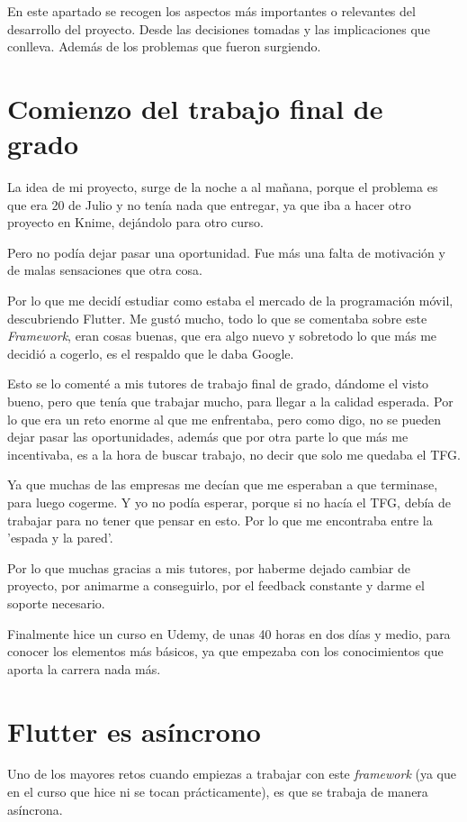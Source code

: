
En este apartado se recogen los aspectos más importantes o relevantes del desarrollo del proyecto. Desde las decisiones tomadas y las implicaciones que conlleva. Además de los problemas que fueron surgiendo.

\section{Comienzo del trabajo final de grado}
La idea de mi proyecto, surge de la noche a al mañana, porque el problema es que era 20 de Julio y no tenía nada que entregar, ya que iba a hacer otro proyecto en Knime, dejándolo para otro curso. 

Pero no podía dejar pasar una oportunidad. Fue más una falta de motivación y de malas sensaciones que otra cosa.

Por lo que me decidí estudiar como estaba el mercado de la programación móvil, descubriendo Flutter. Me gustó mucho, todo lo que se comentaba sobre este \emph{Framework}, eran cosas buenas, que era algo nuevo y sobretodo lo que más me decidió a cogerlo, es el respaldo que le daba Google.

Esto se lo comenté a mis tutores de trabajo final de grado, dándome el visto bueno, pero que tenía que trabajar mucho, para llegar a la calidad esperada. Por lo que era un reto enorme al que me enfrentaba, pero como digo, no se pueden dejar pasar las oportunidades, además que por otra parte lo que más me incentivaba, es a la hora de buscar trabajo, no decir que solo me quedaba el TFG. 

Ya que muchas de las empresas me decían que me esperaban a que terminase, para luego cogerme. Y yo no podía esperar, porque si no hacía el TFG, debía de trabajar para no tener que pensar en esto. Por lo que me encontraba entre la 'espada y la pared'.

Por lo que muchas gracias a mis tutores, por haberme dejado cambiar de proyecto, por animarme a conseguirlo, por el feedback constante y darme el soporte necesario.

Finalmente hice un curso en Udemy, de unas 40 horas en dos días y medio, para conocer los elementos más básicos, ya que empezaba con los conocimientos que aporta la carrera nada más.

\section{Flutter es asíncrono}
Uno de los mayores retos cuando empiezas a trabajar con este \emph{framework} (ya que en el curso que hice ni se tocan prácticamente), es que se trabaja de manera asíncrona.

